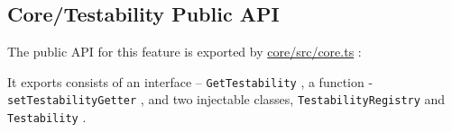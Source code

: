 \subsection{Core/Testability Public API}

The public API for this feature is exported by
\url{core/src/core.ts}
:



It exports consists of an interface –
\texttt{GetTestability}
, a function -
\texttt{setTestabilityGetter}
, and two injectable classes,
\texttt{TestabilityRegistry}
and
\texttt{Testability}
.
